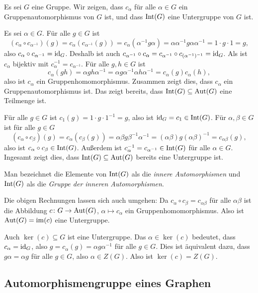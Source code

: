 Es sei $G$ eine Gruppe. Wir zeigen, dass $c_\alpha$ für alle $\alpha \in G$ ein Gruppenautomorphismus von $G$ ist, und dass $\mathrm{Int}(G)$ eine Untergruppe von $G$ ist.

Es sei $\alpha \in G$. Für alle $g \in G$ ist
\[
 (c_\alpha \circ c_{\alpha^{-1}})(g)
 = c_\alpha(c_{\alpha^{-1}}(g))
 = c_\alpha(\alpha^{-1} g \alpha)
 = \alpha \alpha^{-1} g \alpha \alpha^{-1}
 = 1 \cdot g \cdot 1
 = g,
\]
also $c_\alpha \circ c_{\alpha^{-1}} = \mathrm{id}_G$. Deshalb ist auch $c_{\alpha^{-1}} \circ c_\alpha = c_{\alpha^{-1}} \circ c_{(\alpha^{-1})^{-1}} = \mathrm{id}_G$. Als ist $c_\alpha$ bijektiv mit $c_\alpha^{-1} = c_{\alpha^{-1}}$. Für alle $g,h \in G$ ist
\[
 c_\alpha(g h)
 = \alpha g h \alpha^{-1}
 = \alpha g \alpha^{-1} \alpha h \alpha^{-1}
 = c_\alpha(g) c_\alpha(h),
\]
also ist $c_\alpha$ ein Gruppenhomomorphismus. Zusammen zeigt dies, dass $c_\alpha$ ein Gruppenautomorphismus ist. Das zeigt bereits, dass $\mathrm{Int}(G) \subseteq \mathrm{Aut}(G)$ eine Teilmenge ist.

Für alle $g \in G$ ist $c_1(g) = 1 \cdot g \cdot 1^{-1} = g$, also ist $\mathrm{id}_G = c_1 \in \mathrm{Int}(G)$. Für $\alpha, \beta \in G$ ist für alle $g \in G$
\[
 (c_\alpha \circ c_\beta)(g)
 = c_\alpha( c_\beta(g) )
 = \alpha \beta g \beta^{-1} \alpha^{-1}
 = (\alpha \beta) g (\alpha \beta)^{-1}
 = c_{\alpha \beta}(g),
\]
also ist $c_\alpha \circ c_\beta \in \mathrm{Int}(G)$. Außerdem ist $c_\alpha^{-1} = c_{\alpha^{-1}} \in \mathrm{Int}(G)$ für alle $\alpha \in G$. Ingesamt zeigt dies, dass $\mathrm{Int}(G) \subseteq \mathrm{Aut}(G)$ bereits eine Untergruppe ist.

Man bezeichnet die Elemente von $\mathrm{Int}(G)$ als die \emph{innere Automorphismen} und $\mathrm{Int}(G)$ als die \emph{Gruppe der inneren Automorphismen}.

\begin{bem}
 Die obigen Rechnungen lassen sich auch umgehen: Da $c_\alpha \circ c_\beta = c_{\alpha \beta}$ für alle $\alpha \beta$ ist die Abbildung $c \colon G \to \mathrm{Aut}(G)$, $\alpha \mapsto c_\alpha$ ein Gruppenhomomorphismus. Also ist $\mathrm{Aut}(G) = \mathrm{im}(c)$ eine Untergruppe.
 
 Auch $\ker(c) \subseteq G$ ist eine Untergruppe. Das $\alpha \in \ker(c)$ bedeutet, dass $c_\alpha = \mathrm{id}_G$, also $g = c_\alpha(g) = \alpha g \alpha^{-1}$ für alle $g \in G$. Dies ist äquivalent dazu, dass $g \alpha = \alpha g$ für alle $g \in G$, also $\alpha \in Z(G)$. Also ist $\ker(c) = Z(G)$.
\end{bem}



\subsection{Automorphismengruppe eines Graphen}





